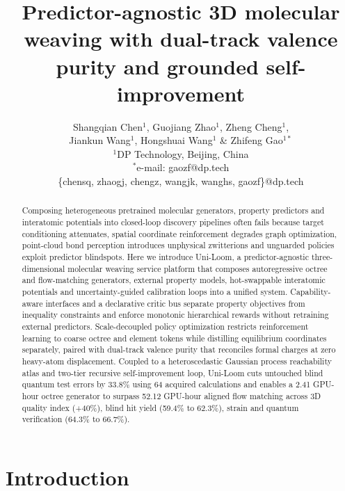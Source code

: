 \documentclass[11pt,a4paper]{article}
\title{\textbf{\Large Predictor-agnostic 3D molecular weaving with dual-track valence purity and grounded self-improvement}}
\author{
Shangqian Chen$^{1}$, Guojiang Zhao$^{1}$, Zheng Cheng$^{1}$,\\
Jiankun Wang$^{1}$, Hongshuai Wang$^{1}$ \& Zhifeng Gao$^{1*}$\\[4pt]
\small $^{1}$DP Technology, Beijing, China\\
\small $^{*}$e-mail: gaozf@dp.tech\\
\scriptsize \{chensq, zhaogj, chengz, wangjk, wanghs, gaozf\}@dp.tech
}
\date{}
\begin{document}
\maketitle

\begin{abstract}
\noindent Composing heterogeneous pretrained molecular generators, property predictors and interatomic potentials into closed-loop discovery pipelines often fails because target conditioning attenuates, spatial coordinate reinforcement degrades graph optimization, point-cloud bond perception introduces unphysical zwitterions and unguarded policies exploit predictor blindspots. Here we introduce Uni-Loom, a predictor-agnostic three-dimensional molecular weaving service platform that composes autoregressive octree and flow-matching generators, external property models, hot-swappable interatomic potentials and uncertainty-guided calibration loops into a unified system. Capability-aware interfaces and a declarative critic bus separate property objectives from inequality constraints and enforce monotonic hierarchical rewards without retraining external predictors. Scale-decoupled policy optimization restricts reinforcement learning to coarse octree and element tokens while distilling equilibrium coordinates separately, paired with dual-track valence purity that reconciles formal charges at zero heavy-atom displacement. Coupled to a heteroscedastic Gaussian process reachability atlas and two-tier recursive self-improvement loop, Uni-Loom cuts untouched blind quantum test errors by 33.8\% using 64 acquired calculations and enables a 2.41 GPU-hour octree generator to surpass 52.12 GPU-hour aligned flow matching across 3D quality index (+40\%), blind hit yield (59.4\% to 62.3\%), strain and quantum verification (64.3\% to 66.7\%).
\end{abstract}

\section*{Introduction}
\end{document}
